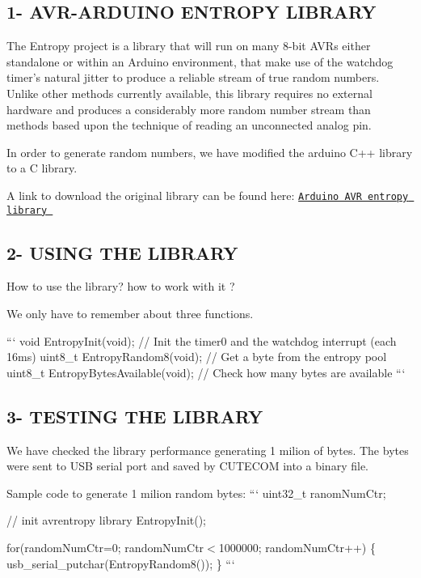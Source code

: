 \subsection*{1-\/ A\+V\+R-\/\+A\+R\+D\+U\+I\+N\+O E\+N\+T\+R\+O\+P\+Y L\+I\+B\+R\+A\+R\+Y }

The Entropy project is a library that will run on many 8-\/bit A\+V\+Rs either standalone or within an Arduino environment, that make use of the watchdog timer's natural jitter to produce a reliable stream of true random numbers. Unlike other methods currently available, this library requires no external hardware and produces a considerably more random number stream than methods based upon the technique of reading an unconnected analog pin.

In order to generate random numbers, we have modified the arduino C++ library to a C library.

A link to download the original library can be found here\+: \href{http://code.google.com/p/avr-hardware-random-number-generation/wiki/WikiAVRentropy}{\tt Arduino A\+V\+R entropy library }

\subsection*{2-\/ U\+S\+I\+N\+G T\+H\+E L\+I\+B\+R\+A\+R\+Y }

How to use the library? how to work with it ?

We only have to remember about three functions.

``` void Entropy\+Init(void); // Init the timer0 and the watchdog interrupt (each 16ms) uint8\+\_\+t Entropy\+Random8(void); // Get a byte from the entropy pool uint8\+\_\+t Entropy\+Bytes\+Available(void); // Check how many bytes are available ```

\subsection*{3-\/ T\+E\+S\+T\+I\+N\+G T\+H\+E L\+I\+B\+R\+A\+R\+Y }

We have checked the library performance generating 1 milion of bytes. The bytes were sent to U\+S\+B serial port and saved by C\+U\+T\+E\+C\+O\+M into a binary file.

Sample code to generate 1 milion random bytes\+: ``` uint32\+\_\+t ranom\+Num\+Ctr;

// init avrentropy library Entropy\+Init();

for(random\+Num\+Ctr=0; random\+Num\+Ctr$<$1000000; random\+Num\+Ctr++) \{ usb\+\_\+serial\+\_\+putchar(\+Entropy\+Random8()); \} ```

